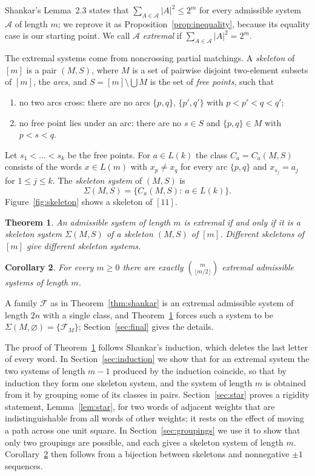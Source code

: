 \documentclass[screen]{aomart}
\newtheorem{theorem}{Theorem}[section]
\newtheorem{corollary}[theorem]{Corollary}
\theoremstyle{definition}
\theoremstyle{remark}
\numberwithin{equation}{section}
\newcommand{\cA}{\mathcal{A}}
\begin{document}
Shankar's Lemma~2.3 states that $\sum_{A\in\cA}|A|^2\le 2^m$ for every admissible system $\cA$ of length $m$; we reprove it as Proposition~\ref{prop:inequality}, because its equality case is our starting point. We call $\cA$ \emph{extremal} if $\sum_{A\in\cA}|A|^2=2^m$.

The extremal systems come from noncrossing partial matchings. A \emph{skeleton} of $[m]$ is a pair $(M,S)$, where $M$ is a set of pairwise disjoint two-element subsets of $[m]$, the \emph{arcs}, and $S=[m]\setminus\bigcup M$ is the set of \emph{free points}, such that
\begin{enumerate}[label=(\alph*)]
\item no two arcs cross: there are no arcs $\{p,q\}$, $\{p',q'\}$ with $p<p'<q<q'$;
\item no free point lies under an arc: there are no $s\in S$ and $\{p,q\}\in M$ with $p<s<q$.
\end{enumerate}
Let $s_1<\dots<s_k$ be the free points. For $a\in L(k)$ the class $C_a=C_a(M,S)$ consists of the words $x\in L(m)$ with $x_p\ne x_q$ for every arc $\{p,q\}$ and $x_{s_j}=a_j$ for $1\le j\le k$. The \emph{skeleton system} of $(M,S)$ is
\[
\Sigma(M,S)=\{C_a(M,S):\ a\in L(k)\}.
\]
Figure~\ref{fig:skeleton} shows a skeleton of $[11]$.

\begin{theorem}\label{thm:main}
An admissible system of length $m$ is extremal if and only if it is a skeleton system $\Sigma(M,S)$ of a skeleton $(M,S)$ of $[m]$. Different skeletons of $[m]$ give different skeleton systems.
\end{theorem}

\begin{corollary}\label{cor:count}
For every $m\ge0$ there are exactly $\binom{m}{\lfloor m/2\rfloor}$ extremal admissible systems of length $m$.
\end{corollary}

A family $\mathcal F$ as in Theorem~\ref{thm:shankar} is an extremal admissible system of length $2n$ with a single class, and Theorem~\ref{thm:main} forces such a system to be $\Sigma(M,\varnothing)=\{\mathcal F_M\}$; Section~\ref{sec:final} gives the details.

The proof of Theorem~\ref{thm:main} follows Shankar's induction, which deletes the last letter of every word. In Section~\ref{sec:induction} we show that for an extremal system the two systems of length $m-1$ produced by the induction coincide, so that by induction they form one skeleton system, and the system of length $m$ is obtained from it by grouping some of its classes in pairs. Section~\ref{sec:star} proves a rigidity statement, Lemma~\ref{lem:star}, for two words of adjacent weights that are indistinguishable from all words of other weights; it rests on the effect of moving a path across one unit square. In Section~\ref{sec:groupings} we use it to show that only two groupings are possible, and each gives a skeleton system of length $m$. Corollary~\ref{cor:count} then follows from a bijection between skeletons and nonnegative $\pm1$ sequences.
\end{document}

